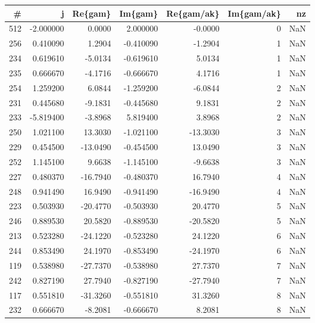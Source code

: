 \begin{tabular}{rrrrrrr}
\toprule
  \# &           j &   Re\{gam\} &     Im\{gam\} &  Re\{gam/ak\} &  Im\{gam/ak\} &  nz \\
\midrule
512 &   -2.000000 &    0.0000 &    2.000000 &     -0.0000 &           0 & NaN \\
256 &    0.410090 &    1.2904 &   -0.410090 &     -1.2904 &           1 & NaN \\
234 &    0.619610 &   -5.0134 &   -0.619610 &      5.0134 &           1 & NaN \\
235 &    0.666670 &   -4.1716 &   -0.666670 &      4.1716 &           1 & NaN \\
254 &    1.259200 &    6.0844 &   -1.259200 &     -6.0844 &           2 & NaN \\
231 &    0.445680 &   -9.1831 &   -0.445680 &      9.1831 &           2 & NaN \\
233 &   -5.819400 &   -3.8968 &    5.819400 &      3.8968 &           2 & NaN \\
250 &    1.021100 &   13.3030 &   -1.021100 &    -13.3030 &           3 & NaN \\
229 &    0.454500 &  -13.0490 &   -0.454500 &     13.0490 &           3 & NaN \\
252 &    1.145100 &    9.6638 &   -1.145100 &     -9.6638 &           3 & NaN \\
227 &    0.480370 &  -16.7940 &   -0.480370 &     16.7940 &           4 & NaN \\
248 &    0.941490 &   16.9490 &   -0.941490 &    -16.9490 &           4 & NaN \\
223 &    0.503930 &  -20.4770 &   -0.503930 &     20.4770 &           5 & NaN \\
246 &    0.889530 &   20.5820 &   -0.889530 &    -20.5820 &           5 & NaN \\
213 &    0.523280 &  -24.1220 &   -0.523280 &     24.1220 &           6 & NaN \\
244 &    0.853490 &   24.1970 &   -0.853490 &    -24.1970 &           6 & NaN \\
119 &    0.538980 &  -27.7370 &   -0.538980 &     27.7370 &           7 & NaN \\
242 &    0.827190 &   27.7940 &   -0.827190 &    -27.7940 &           7 & NaN \\
117 &    0.551810 &  -31.3260 &   -0.551810 &     31.3260 &           8 & NaN \\
232 &    0.666670 &   -8.2081 &   -0.666670 &      8.2081 &           8 & NaN \\

\end{tabular}
